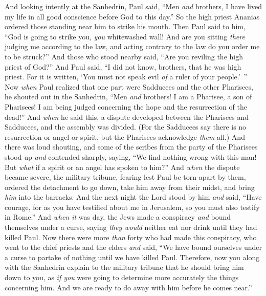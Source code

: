 \begin{biblechapter} %
 And looking intently at the Sanhedrin, Paul said, “Men \textit{and} brothers, I have lived my life in all good conscience before God to this day.”
\verse So the high priest Ananias ordered those standing near him to strike his mouth.
\verse Then Paul said to him, “God is going to strike you, \textit{you} whitewashed wall! And are you sitting \textit{there} judging me according to the law, and acting contrary to the law do you order me to be struck?”
\verse And those who stood nearby said, “Are you reviling the high priest of God?”
\verse And Paul said, “I did not know, brothers, that he was high priest. For it is written, ‘You must not speak evil \textit{of} a ruler of your people.’ ”
\verse Now \textit{when} Paul realized that one part were Sadducees and the other Pharisees, he shouted out in the Sanhedrin, “Men \textit{and} brothers! I am a Pharisee, a son of Pharisees! I am being judged concerning the hope and the resurrection of the dead!”
\verse And \textit{when} he said this, a dispute developed between the Pharisees and Sadducees, and the assembly was divided.
\verse (For the Sadducees say there is no resurrection or angel or spirit, but the Pharisees acknowledge \textit{them} all.)
\verse And there was loud shouting, and some of the scribes from the party of the Pharisees stood up \textit{and} contended sharply, saying, “We find nothing wrong with this man! But \textit{what} if a spirit or an angel has spoken to him?”
\verse And \textit{when} the dispute became severe, the military tribune, fearing lest Paul be torn apart by them, ordered the detachment to go down, take him away from their midst, and bring \textit{him} into the barracks.
\verse And the next night the Lord stood by him \textit{and} said, “Have courage, for as you have testified about me in Jerusalem, so you must also testify in Rome.”
 And \textit{when it} was day, the Jews made a conspiracy \textit{and} bound themselves under a curse, saying \textit{they would} neither eat nor drink until they had killed Paul.
\verse Now there were more \textit{than} forty who had made this conspiracy,
\verse who went to the chief priests and the elders \textit{and} said, “We have bound ourselves under a curse to partake of nothing until we have killed Paul.
\verse Therefore, now you along with the Sanhedrin explain to the military tribune that he should bring him down to you, as \textit{if you} were going to determine more accurately the things concerning him. And we are ready to do away with him before he comes near.”

\end{biblechapter}
